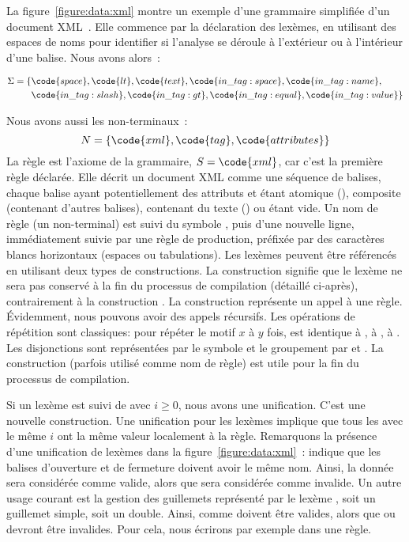 La figure~\ref{figure:data:xml} montre un exemple d'une grammaire simplifiée
d'un document XML~. Elle commence par la déclaration des lexèmes, en
utilisant des espaces de noms pour identifier si l'analyse se déroule à
l'extérieur ou à l'intérieur d'une balise. Nous avons alors~:
%
\begin{center}
\begin{align*}
\Sigma = \{ & \code{space}, \code{lt}, \code{text}, \code{in\_tag:space},
              \code{in\_tag:name}, \\
            & \code{in\_tag:slash}, \code{in\_tag:gt}, \code{in\_tag:equal},
              \code{in\_tag:value} \}
\end{align*}
\end{center}
%
Nous avons aussi les non-terminaux~:
%
$$N = \{\code{xml}, \code{tag}, \code{attributes}\}$$
%
La règle  est l'axiome de la grammaire, $S = \code{xml}$, car c'est la
première règle déclarée. Elle décrit un document XML comme une séquence de
balises, chaque balise ayant potentiellement des attributs et étant atomique
(), composite (contenant d'autres balises), contenant du texte
() ou étant vide. Un nom de règle (un non-terminal)
est suivi du symbole \code{:}, puis d'une nouvelle ligne, immédiatement suivie
par une règle de production, préfixée par des caractères blancs horizontaux
(espaces ou tabulations). Les lexèmes peuvent être référencés en utilisant deux
types de constructions. La construction  signifie que le lexème
ne sera pas conservé à la fin du processus de compilation (détaillé ci-après),
contrairement à la construction . La construction 
représente un appel à une règle.  Évidemment, nous pouvons avoir des appels
récursifs. Les opérations de répétition sont classiques: 
pour répéter le motif $x$ à $y$ fois,  est identique à ,
\code{+} à , \code{*} à . Les disjonctions sont
représentées par le symbole \code{\mvert} et le groupement par \code{(} et
\code{)}. La construction  (parfois utilisé comme nom de règle) est
utile pour la fin du processus de compilation.

Si un lexème est suivi de \code{[$i$]} avec $i \geq 0$, nous avons une
unification. C'est une nouvelle construction. Une unification pour les lexèmes
implique que tous les  avec le même $i$ ont la même valeur
localement à la règle.  Remarquons la présence d'une unification de lexèmes dans
la figure~\ref{figure:data:xml}~:  indique que les balises
d'ouverture et de fermeture doivent avoir le même nom. Ainsi, la donnée
 sera considérée comme valide, alors que 
sera considérée comme invalide. Un autre usage courant est la gestion des
guillemets représenté par le lexème , soit un guillemet
simple, soit un double. Ainsi,  comme  doivent être valides,
alors que  ou  devront être invalides. Pour cela, nous
écrirons par exemple  dans une règle.

